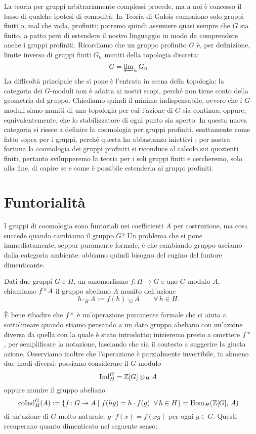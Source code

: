 
\begin{profinite}
	La teoria per gruppi arbitrariamente complessi procede, ma a noi è concesso il lusso di qualche ipotesi di comodità. In Teoria di Galois compaiono solo gruppi finiti o, mal che vada, profiniti; potremo quindi assumere quasi sempre che $ G $ sia finito, a patto però di estendere il nostro linguaggio in modo da comprendere anche i gruppi profiniti. Ricordiamo che un gruppo profinito $ G $ è, per definizione, limite inverso di gruppi finiti $ G_n $ muniti della topologia discreta:
	$$  G = \textstyle \varprojlim_n G_n  $$
	La difficoltà principale che si pone è l'entrata in scena della topologia: la categoria dei $ G $-moduli non è adatta ai nostri scopi, perché non tiene conto della geometria del gruppo. Chiediamo quindi il minimo indispensabile, ovvero che i $ G $-moduli siano muniti di una topologia per cui l'azione di $ G $ sia continua; oppure, equivalentemente, che lo stabilizzatore di ogni punto sia aperto. In questa nuova categoria si riesce a definire la coomologia per gruppi profiniti, esattamente come fatto sopra per i gruppi, perché questa ha abbastanza iniettivi \cite[Lemma 6.11.10]{Weibel}; per nostra fortuna la coomologia dei gruppi profiniti si riconduce al calcolo sui quozienti finiti, pertanto svilupperemo la teoria per i soli gruppi finiti e cercheremo, solo alla fine, di capire se e come è possibile estenderla ai gruppi profiniti.
\end{profinite}

\section{Funtorialità}
I gruppi di coomologia sono funtoriali nei coefficienti $ A $ per costruzione, ma cosa succede quando cambiamo il gruppo $ G $? Un problema che si pone immediatamente, seppur puramente formale, è che cambiando gruppo usciamo dalla categoria ambiente: abbiamo quindi bisogno del cugino del funtore dimenticante.

\begin{definition}
	Dati due gruppi $ G $ e $ H $, un omomorfismo $ f \colon H \to G $ e uno $ G $-modulo $ A $, chiamiamo $ f^\times A $ il gruppo abeliano $ A $ munito dell'azione
	\[ h \cdot_{H} A := f(h) \cdot_{G} A \qquad \forall\, h \in H. \]
\end{definition}

È bene ribadire che $ f^\times $ è un'operazione puramente formale che ci aiuta a sottolineare quando stiamo pensando a un dato gruppo abeliano con un'azione diversa da quella con la quale è stato introdotto; inizieremo presto a omettere $ f^\times $, per semplificare la notazione, lasciando che sia il contesto a suggerire la giusta azione. Osserviamo inoltre che l'operazione è parzialmente invertibile, in akmeno due modi diversi: possiamo considerare il $ G $-modulo
\[ \operatorname{Ind}_{H}^G = \mathbb{Z}[G] \otimes_H A \]
oppure munire il gruppo abeliano
\[ \operatorname{coInd}_{H}^G(A) := \{ f \colon G \to A \mid f(hg) = h \cdot f(g) \;\; \forall\, h \in H \} = \operatorname{Hom}_{H}(\mathbb{Z}[G], \, A) \]
di un'azione di $ G $ molto naturale:
$ g \cdot f(x) = f(xg)$ per ogni $ g \in G. $
Questi recuperano quanto dimenticato nel seguente senso:

